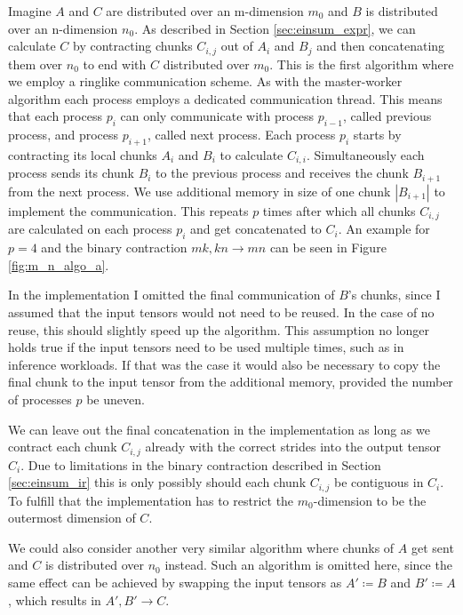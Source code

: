 Imagine $A$ and $C$ are distributed over an m-dimension $m_0$ and $B$ is distributed over an n-dimension $n_0$.
As described in Section \ref{sec:einsum_expr}, we can calculate $C$ by contracting chunks $C_{i,j}$ out of $A_i$ and $B_j$ and then concatenating them over $n_0$ to end with $C$ distributed over $m_0$.
This is the first algorithm where we employ a ringlike communication scheme.
As with the master-worker algorithm each process employs a dedicated communication thread.
This means that each process $p_i$ can only communicate with process $p_{i-1}$, called previous process, and process $p_{i+1}$, called next process.
Each process $p_i$ starts by contracting its local chunks $A_i$ and $B_i$ to calculate $C_{i,i}$.
Simultaneously each process sends its chunk $B_i$ to the previous process and receives the chunk $B_{i+1}$ from the next process.
We use additional memory in size of one chunk $|B_{i+1}|$ to implement the communication.
This repeats $p$ times after which all chunks $C_{i,j}$ are calculated on each process $p_i$ and get concatenated to $C_i$.
An example for $p=4$ and the binary contraction $mk, kn \rightarrow mn$ can be seen in Figure \ref{fig:m_n_algo_a}.

In the implementation I omitted the final communication of $B$'s chunks, since I assumed that the input tensors would not need to be reused.
In the case of no reuse, this should slightly speed up the algorithm.
This assumption no longer holds true if the input tensors need to be used multiple times, such as in inference workloads.
If that was the case it would also be necessary to copy the final chunk to the input tensor from the additional memory, provided the number of processes $p$ be uneven.

We can leave out the final concatenation in the implementation as long as we contract each chunk $C_{i,j}$ already with the correct strides into the output tensor $C_i$.
Due to limitations in the binary contraction described in Section \ref{sec:einsum_ir} this is only possibly should each chunk $C_{i,j}$ be contiguous in $C_i$.
To fulfill that the implementation has to restrict the $m_0$-dimension to be the outermost dimension of $C$.

We could also consider another very similar algorithm where chunks of $A$ get sent and $C$ is distributed over $n_0$ instead.
Such an algorithm is omitted here, since the same effect can be achieved by swapping the input tensors as $A' \coloneqq B$ and $B' \coloneqq A$, which results in $A',B' \rightarrow C$.

